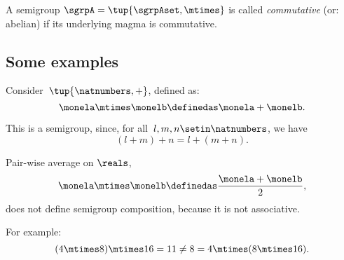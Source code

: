 \begin{definition}
    A semigroup $\sgrpA = \tup{\sgrpAset, \mtimes}$ is called \emph{commutative} (or: abelian) if its underlying magma is commutative.
\end{definition}

\subsection{Some examples}

\begin{example}
    \label{exa:natnum-semigroup}
    Consider~$\tup{\natnumbers,+}$, defined as:
    \begin{equation*}
        \label{eq:natnum-semigroup-definition}
        \monela \mtimes \monelb \definedas  \monela + \monelb.
    \end{equation*}

    This is a semigroup, since, for all~$l,m, n \setin \natnumbers$, we have
    \begin{equation}
        (l+m)
        +n = l+(m+n).
    \end{equation}
\end{example}

\begin{example}
    Pair-wise average on $\reals$,
    \begin{equation}
        \label{eq:pairwise}
        \monela \mtimes \monelb \definedas  \frac{\monela + \monelb}{2},
    \end{equation}
    does not define semigroup composition, because it is not associative.

    For example:
    \begin{equation}
        \label{eq:pairwise-counterexample}
        (4 \mtimes 8) \mtimes 16 = 11 \neq  8 = 4 \mtimes (8 \mtimes 16).
    \end{equation}
\end{example}


